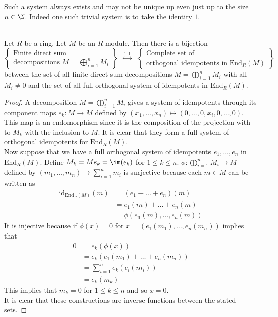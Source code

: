 \documentclass[a4paper]{article}
\begin{document}
Such a system always exists and may not be unique up even just up to the size $n\in\N$. Indeed one such trivial system is to take the identity $1$. 

\begin{prp}{}{}\\
Let $R$ be a ring. Let $M$ be an $R$-module. Then there is a bijection $$\left\{\substack{\text{Finite direct sum}\\\text{decompositions }M=\bigoplus_{i=1}^n M_i}\right\}\;\;\overset{1:1}{\longleftrightarrow}\;\;\left\{\substack{\text{Complete set of}\\\text{orthogonal idempotents in }\text{End}_R(M)}\right\}$$ between the set of all finite direct sum decompositions $M=\bigoplus_{i=1}^n M_i$ with all $M_i\neq 0$ and the set of all full orthogonal system of idempotents in $\text{End}_R(M)$. 
\begin{proof}
A decomposition $M=\bigoplus_{i=1}^nM_i$ gives a system of idempotents through its component maps $e_k:M\to M$ defined by $(x_1,\dots,x_n)\mapsto(0,\dots,0,x_i,0,\dots,0)$. This map is an endomorphism since it is the composition of the projection with to $M_k$ with the inclusion to $M$. It is clear that they form a full system of orthogonal idempotents for $\text{End}_R(M)$. \\

Now suppose that we have a full orthogonal system of idempotents $e_1,\dots,e_n$ in $\text{End}_R(M)$. Define $M_k=Me_k=\im(e_k)$ for $1\leq k\leq n$. $\phi:\bigoplus_{i=1}^nM_i\to M$ defined by $(m_1,\dots,m_n)\mapsto\sum_{i=1}^nm_i$ is surjective because each $m\in M$ can be written as 
\begin{align*}
\text{id}_{\text{End}_R(M)}(m)&=(e_1+\dots+e_n)(m)\\
&=e_1(m)+\dots+e_n(m)\\
&=\phi(e_1(m),\dots,e_n(m))
\end{align*}
It is injective because if $\phi(x)=0$ for $x=(e_1(m_1),\dots,e_n(m_n))$ implies that 
\begin{align*}
0&=e_k(\phi(x))\\
&=e_k(e_1(m_1)+\dots+e_n(m_n))\\
&=\sum_{i=1}^ne_k(e_i(m_i))\\
&=e_k(m_k)
\end{align*}
This implies that $m_k=0$ for $1\leq k\leq n$ and so $x=0$. \\

It is clear that these constructions are inverse functions between the stated sets. 
\end{proof}
\end{prp}
\end{document}
